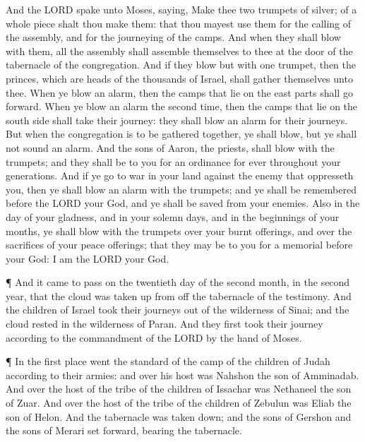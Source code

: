  And the LORD spake unto Moses, saying,  Make
thee two trumpets of silver; of a whole piece shalt thou make them: that
thou mayest use them for the calling of the assembly, and for the
journeying of the camps.  And when they shall blow with
them, all the assembly shall assemble themselves to thee at the door of
the tabernacle of the congregation.  And if they blow but
with one trumpet, then the princes, which are heads of the thousands of
Israel, shall gather themselves unto thee.  When ye blow an
alarm, then the camps that lie on the east parts shall go forward.
 When ye blow an alarm the second time, then the camps that
lie on the south side shall take their journey: they shall blow an alarm
for their journeys.  But when the congregation is to be
gathered together, ye shall blow, but ye shall not sound an alarm.
 And the sons of Aaron, the priests, shall blow with the
trumpets; and they shall be to you for an ordinance for ever throughout
your generations.  And if ye go to war in your land against
the enemy that oppresseth you, then ye shall blow an alarm with the
trumpets; and ye shall be remembered before the LORD your God, and ye
shall be saved from your enemies.  Also in the day of your
gladness, and in your solemn days, and in the beginnings of your months,
ye shall blow with the trumpets over your burnt offerings, and over the
sacrifices of your peace offerings; that they may be to you for a
memorial before your God: I am the LORD your God.

 ¶ And it came to pass on the twentieth day of the second
month, in the second year, that the cloud was taken up from off the
tabernacle of the testimony.  And the children of Israel
took their journeys out of the wilderness of Sinai; and the cloud rested
in the wilderness of Paran.  And they first took their
journey according to the commandment of the LORD by the hand of Moses.

 ¶ In the first place went the standard of the camp of the
children of Judah according to their armies: and over his host was
Nahshon the son of Amminadab.  And over the host of the
tribe of the children of Issachar was Nethaneel the son of Zuar.
 And over the host of the tribe of the children of Zebulun
was Eliab the son of Helon.  And the tabernacle was taken
down; and the sons of Gershon and the sons of Merari set forward,
bearing the tabernacle.

